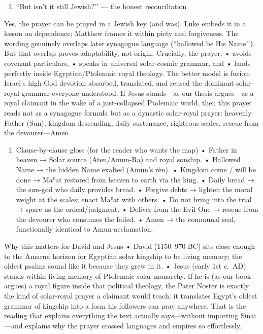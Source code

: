 \begin{enumerate}
\def\labelenumi{\arabic{enumi})}
\setcounter{enumi}{4}
\item
``But isn’t it still Jewish?’’ — the honest reconciliation
\end{enumerate}
Yes, the prayer can be prayed in a Jewish key (and was).
Luke embeds it in a lesson on dependence; Matthew frames it within piety and forgiveness.
The wording genuinely overlaps later synagogue language (``hallowed be His Name’’).
But that overlap proves adaptability, not origin.
Crucially, the prayer: • avoids covenant particulars, • speaks in universal solar-cosmic grammar, and • lands perfectly inside Egyptian/Ptolemaic royal theology.
The better model is fusion: Israel’s high-God devotion absorbed, translated, and reused the dominant solar-royal grammar everyone understood.
If Jesus stands—as our thesis argues—as a royal claimant in the wake of a just-collapsed Ptolemaic world, then this prayer reads not as a synagogue formula but as a dynastic solar-royal prayer: heavenly Father (Sun), kingdom descending, daily sustenance, righteous scales, rescue from the devourer—Amen.

\begin{enumerate}
\def\labelenumi{\arabic{enumi})}
\setcounter{enumi}{5}
\item
Clause-by-clause gloss (for the reader who wants the map) • Father in heaven → Solar source (Aten/Amun-Ra) and royal sonship.
• Hallowed Name → the hidden Name exalted (Amun’s rèn).
• Kingdom come / will be done → Maʿat restored from heaven to earth via the king.
• Daily bread → the sun-god who daily provides bread.
• Forgive debts → lighten the moral weight at the scales; enact Maʿat with others.
• Do not bring into the trial → spare us the ordeal/judgment.
• Deliver from the Evil One → rescue from the devourer who consumes the failed.
• Amen → the communal seal, functionally identical to Amun-acclamation.
\end{enumerate}
Why this matters for David and Jesus • David (1150–970 BC) sits close enough to the Amarna horizon for Egyptian solar kingship to be living memory; the oldest psalms sound like it because they grew in it.
• Jesus (early 1st c.~AD) stands within living memory of Ptolemaic solar monarchy.
If he is (as our book argues) a royal figure inside that political theology, the Pater Noster is exactly the kind of solar-royal prayer a claimant would teach: it translates Egypt’s oldest grammar of kingship into a form his followers can pray anywhere.
That is the reading that explains everything the text actually says—without importing Sinai—and explains why the prayer crossed languages and empires so effortlessly.

